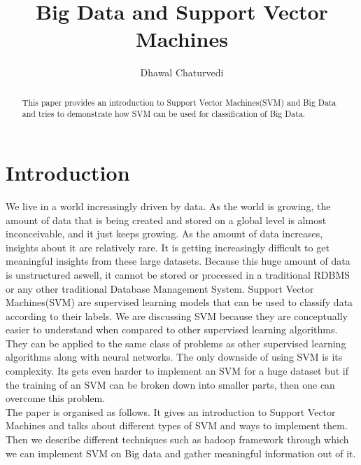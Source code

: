 \documentclass[sigconf]{acmart}
\begin{document}
\title{Big Data and Support Vector Machines}


\author{Dhawal Chaturvedi}



\renewcommand{\shortauthors}{D.Chaturvedi}


\begin{abstract}
This paper provides an introduction to Support Vector Machines(SVM) and Big Data and tries to demonstrate how SVM can be used for classification of Big Data.
\end{abstract}



\maketitle


\section{Introduction}
We live in a world increasingly driven by data. As the world is growing, the amount of data that is being created and stored on a global level is almost inconceivable, and it just keeps growing. As the amount of data increases, insights about it are relatively rare. It is getting increasingly difficult to get meaningful insights from these large datasets. Because this huge amount of data is unstructured aswell, it cannot be stored or processed in a traditional RDBMS or any other traditional Database Management System. Support Vector Machines(SVM) are supervised learning models that can be used to classify data according to their labels. We are discussing SVM because they are conceptually easier to understand when compared to other supervised learning algorithms. They can be applied to the same class of problems as other supervised learning algorithms along with neural networks. The only downside of using SVM is its complexity. Its gets even harder to implement an SVM for a huge dataset but if the training of an SVM can be broken down into smaller parts, then one can overcome this problem. 
\\
The paper is organised as follows. It gives an introduction to Support Vector Machines and talks about different types of SVM and ways to implement them. Then we describe different techniques such as hadoop framework through which we can implement SVM on Big data and gather meaningful information out of it.
\end{document}

